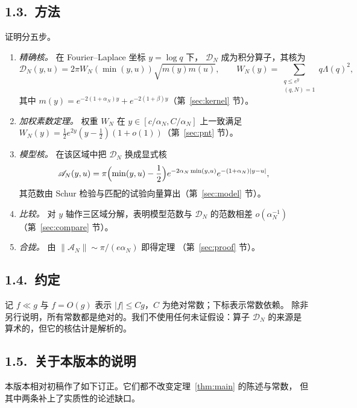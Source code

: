 \documentclass[12pt,a4paper]{amsart}
\numberwithin{equation}{section}
\theoremstyle{plain}
\theoremstyle{definition}
\begin{document}
\subsection*{1.3.\ 方法}

证明分五步。

\begin{enumerate}
\item[\rm(A)] \emph{精确核。} 在 Fourier--Laplace 坐标 $y=\log q$ 下，
$\mathcal D_N$ 成为积分算子，其核为
\[
 \mathscr D_N(y,u)=2\pi W_N(\min(y,u))\sqrt{m(y)m(u)},\qquad
 W_N(y)=\sum_{\substack{q\le e^y\\(q,N)=1}}q\Lambda(q)^2 ,
\]
其中 $m(y)=e^{-2(1+\alpha_N)y}+e^{-2(1+\beta)y}$（第~\ref{sec:kernel} 节）。
\item[\rm(B)] \emph{加权素数定理。} 权重 $W_N$ 在
$y\in[c/\alpha_N,C/\alpha_N]$ 上一致满足
$W_N(y)=\frac12e^{2y}(y-\frac12)(1+o(1))$（第~\ref{sec:pnt} 节）。
\item[\rm(C)] \emph{模型核。} 在该区域中把 $\mathscr D_N$ 换成显式核
\[
 \mathscr A_N(y,u)=\pi\Bigl(\min(y,u)-\frac12\Bigr)
 e^{-2\alpha_N\min(y,u)}e^{-(1+\alpha_N)|y-u|},
\]
其范数由 Schur 检验与匹配的试验向量算出（第~\ref{sec:model} 节）。
\item[\rm(D)] \emph{比较。} 对 $y$ 轴作三区域分解，表明模型范数与
$\mathcal D_N$ 的范数相差 $o(\alpha_N^{-1})$（第~\ref{sec:compare} 节）。
\item[\rm(E)] \emph{合拢。} 由 $\|\mathscr A_N\|\sim\pi/(e\alpha_N)$ 即得定理
（第~\ref{sec:proof} 节）。
\end{enumerate}

\subsection*{1.4.\ 约定}

记 $f\ll g$ 与 $f=O(g)$ 表示 $|f|\le Cg$，$C$ 为绝对常数；下标表示常数依赖。
除非另行说明，所有常数都是绝对的。我们不使用任何未证假设：算子 $\mathcal D_N$
的来源是算术的，但它的核估计是解析的。

\subsection*{1.5.\ 关于本版本的说明}

本版本相对初稿作了如下订正。它们都不改变定理~\ref{thm:main} 的陈述与常数，
但其中两条补上了实质性的论述缺口。
\end{document}
